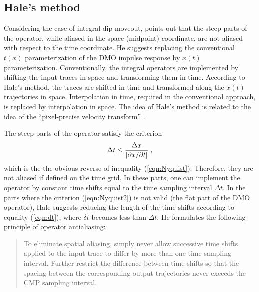 \subsection{Hale's method}

Considering the case of integral dip moveout, \cite{GEO56-06-07950805}
points out that the steep parts of the operator, while aliased in the
space (midpoint) coordinate, are not aliased with respect to the time
coordinate. He suggests replacing the conventional $t(x)$
parameterization of the DMO impulse response by $x(t)$
parameterization. Conventionally, the integral operators are
implemented by shifting the input traces in space and transforming
them in time.  According to Hale's method, the traces are shifted in
time and transformed along the $x(t)$ trajectories in space.
Interpolation in time, required in the conventional approach, is
replaced by interpolation in space. The idea of Hale's method is
related to the idea of the ``pixel-precise velocity transform''
\cite[]{Claerbout.blackwell.92}.

The steep parts of the operator satisfy the criterion
\begin{equation}
\Delta t \leq {{\Delta x} \over {|\partial x / \partial t|}}\;,
\label{eqn:Nyquist2}
\end{equation}
which is the the obvious reverse of inequality (\ref{eqn:Nyquist}).
Therefore, they are not aliased if defined on the time grid. In these
parts, one can implement the operator by constant time shifts equal to
the time sampling interval $\Delta t$. In the parts where the
criterion (\ref{eqn:Nyquist2}) is not valid (the flat part of the DMO
operator), Hale suggests reducing the length of the time shifts
according to equality (\ref{eqn:dt}), where $\delta t$ becomes less
than $\Delta t$. He formulates the following principle of operator
antialiasing:
\begin{quote}
  To eliminate spatial aliasing, simply never allow successive time
shifts applied to the input trace to differ by more than one time
sampling interval. Further restrict the difference between time shifts
so that the spacing between the corresponding output trajectories
never exceeds the CMP sampling interval.
\end{quote}


